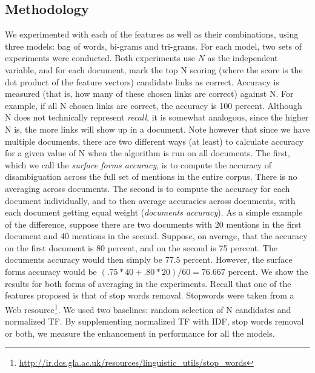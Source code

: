 \subsection{Methodology}
We experimented with each of the features as well as their combinations, using three models: bag of words, bi-grams and tri-grams. For each model, two sets of experiments were conducted. Both experiments use $N$ as the independent variable, and for each document, mark the top N scoring (where the score is the dot product of the feature vectors) candidate links as correct. Accuracy is measured (that is, how many of these chosen links are correct) against N. For example, if all N chosen links are correct, the accuracy is 100 percent. Although N does not technically represent \emph{recall}, it is somewhat analogous, since the higher N is, the more links will show up in a document. Note however that since we have multiple documents, there are two different ways (at least) to calculate accuracy for a given value of N when the algorithm is run on all documents. The first, which we call the \emph{surface forms accuracy}, is to compute the accuracy of disambiguation across the full set of mentions in the entire corpus. There is no averaging across documents. The second is to compute the accuracy for each document individually, and to then average accuracies across documents, with each document getting equal weight (\emph{documents accuracy}). As a simple example of the difference, suppose there are two documents with 20 mentions in the first document and 40 mentions in the second. Suppose, on average, that the accuracy on the first document is 80 percent, and on the second is 75 percent. The documents accuracy would then simply be 77.5 percent. However, the surface forms accuracy would be $(.75*40+.80*20)/60=76.667$ percent. We show the results for both forms of averaging in the experiments. Recall that one of the features proposed is that of stop words removal. Stopwords were taken from a Web resource\footnote{\url{http://ir.dcs.gla.ac.uk/resources/linguistic_utils/stop_words}}. We used two baselines: random selection of N candidates and normalized TF. By supplementing normalized TF with IDF, stop words removal or both, we measure the enhancement in performance for all the models.
